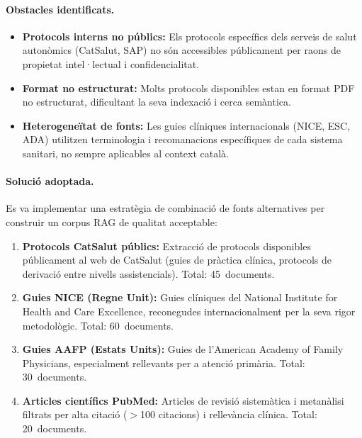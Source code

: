 \documentclass[CAT]{TFUOC}%
\begin{document}
\paragraph{Obstacles identificats.}
\begin{itemize}
    \item \textbf{Protocols interns no públics:} Els protocols específics dels serveis de salut autonòmics (CatSalut, SAP) no són accessibles públicament per raons de propietat intel·lectual i confidencialitat.
    \item \textbf{Format no estructurat:} Molts protocols disponibles estan en format PDF no estructurat, dificultant la seva indexació i cerca semàntica.
    \item \textbf{Heterogeneïtat de fonts:} Les guies clíniques internacionals (NICE, ESC, ADA) utilitzen terminologia i recomanacions específiques de cada sistema sanitari, no sempre aplicables al context català.
\end{itemize}

\paragraph{Solució adoptada.}
Es va implementar una estratègia de combinació de fonts alternatives per construir un corpus RAG de qualitat acceptable:

\begin{enumerate}
    \item \textbf{Protocols CatSalut públics:} Extracció de protocols disponibles públicament al web de CatSalut (guies de pràctica clínica, protocols de derivació entre nivells assistencials). Total: 45~documents.
    
    \item \textbf{Guies NICE (Regne Unit):} Guies clíniques del National Institute for Health and Care Excellence, reconegudes internacionalment per la seva rigor metodològic. Total: 60~documents.
    
    \item \textbf{Guies AAFP (Estats Units):} Guies de l'American Academy of Family Physicians, especialment rellevants per a atenció primària. Total: 30~documents.
    
    \item \textbf{Articles científics PubMed:} Articles de revisió sistemàtica i metanàlisi filtrats per alta citació ($>$100 citacions) i rellevància clínica. Total: 20~documents.
\end{enumerate}
\end{document}
